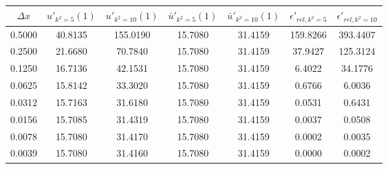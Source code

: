 \begin{tabular}{|c|c|c|c|c|c|c|}
\hline
\textbf{$\Delta x$}&\textbf{$u'_{k^2=5}(1)$}&\textbf{$u'_{k^2=10}(1)$}&\textbf{$\bar{u}'_{k^2=5}(1)$}&\textbf{$\bar{u}'_{k^2=10}(1)$}&\textbf{$\epsilon'_{rel,k^2=5}$}&\textbf{$\epsilon'_{rel,k^2=10}$}\\\hline
0.5000&40.8135&155.0190&15.7080&31.4159&159.8266&393.4407\\\hline
0.2500&21.6680&70.7840&15.7080&31.4159&37.9427&125.3124\\\hline
0.1250&16.7136&42.1531&15.7080&31.4159&6.4022&34.1776\\\hline
0.0625&15.8142&33.3020&15.7080&31.4159&0.6766&6.0036\\\hline
0.0312&15.7163&31.6180&15.7080&31.4159&0.0531&0.6431\\\hline
0.0156&15.7085&31.4319&15.7080&31.4159&0.0037&0.0508\\\hline
0.0078&15.7080&31.4170&15.7080&31.4159&0.0002&0.0035\\\hline
0.0039&15.7080&31.4160&15.7080&31.4159&0.0000&0.0002\\\hline
\end{tabular}
